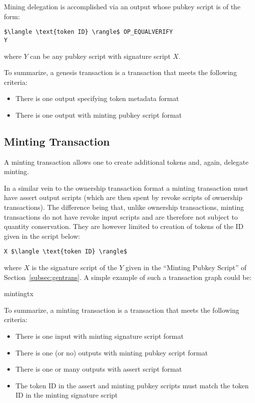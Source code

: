 \documentclass[9pt,oneside]{amsart}
\begin{document}
Mining delegation is accomplished via an output whose pubkey script is of the form:

\begin{lstlisting}[title={\textbf{Minting PubKey Script}}]
$\langle \text{token ID} \rangle$ OP_EQUALVERIFY
Y
\end{lstlisting}
where $Y$ can be any pubkey script with signature script $X$. 

To summarize, a genesis transaction is a transaction that meets the following criteria:
\begin{itemize}
    \item There is one output specifying token metadata format
    \item There is one output with minting pubkey script format
\end{itemize}

\subsection{Minting Transaction}
A minting transaction allows one to create additional tokens and, again, delegate minting.

In a similar vein to the ownership transaction format a minting transaction must have assert output scripts (which are then spent by revoke scripts of ownership transactions). The difference being that, unlike ownership transactions, minting transactions do not have revoke input scripts and are therefore not subject to quantity conservation. They are however limited to creation of tokens of the ID given in the script below:

\begin{lstlisting}[title={\textbf{Minting Signature Script}}]
X $\langle \text{token ID} \rangle$
\end{lstlisting}
where $X$ is the signature script of the $Y$ given in the ``Minting Pubkey Script'' of Section~\ref{subsec:gentrans}. A simple example of such a transaction graph could be: 
\begin{center}
{mintingtx}
\end{center}

To summarize, a minting transaction is a transaction that meets the following criteria:
\begin{itemize}
    \item There is one input with minting signature script format
    \item There is one (or no) outputs with minting pubkey script format
    \item There is one or many outputs with assert script format
    \item The token ID in the assert and minting pubkey scripts must match the token ID in the minting signature script
\end{itemize}
\end{document}
